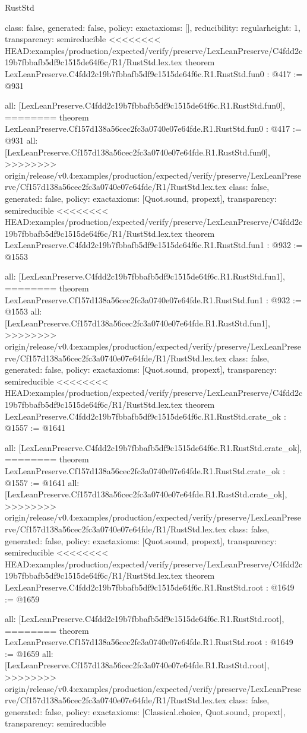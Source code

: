 \begin{lexlean}{RustStd}
\begin{coremodule}
{\begin{coremodule}
{{{  class: false,
  generated: false,
  policy: exact{axioms: []},
  reducibility: regular{height: 1},
  transparency: semireducible
}
<<<<<<<< HEAD:examples/production/expected/verify/preserve/LexLeanPreserve/C4fdd2c19b7fbbafb5df9c1515de64f6c/R1/RustStd.lex.tex
theorem LexLeanPreserve.C4fdd2c19b7fbbafb5df9c1515de64f6c.R1.RustStd.fun0 : @417 := @931 {
  all: [LexLeanPreserve.C4fdd2c19b7fbbafb5df9c1515de64f6c.R1.RustStd.fun0],
========
theorem LexLeanPreserve.Cf157d138a56cec2fc3a0740e07e64fde.R1.RustStd.fun0 : @417 := @931 {
  all: [LexLeanPreserve.Cf157d138a56cec2fc3a0740e07e64fde.R1.RustStd.fun0],
>>>>>>>> origin/release/v0.4:examples/production/expected/verify/preserve/LexLeanPreserve/Cf157d138a56cec2fc3a0740e07e64fde/R1/RustStd.lex.tex
  class: false,
  generated: false,
  policy: exact{axioms: [Quot.sound, propext]},
  transparency: semireducible
}
<<<<<<<< HEAD:examples/production/expected/verify/preserve/LexLeanPreserve/C4fdd2c19b7fbbafb5df9c1515de64f6c/R1/RustStd.lex.tex
theorem LexLeanPreserve.C4fdd2c19b7fbbafb5df9c1515de64f6c.R1.RustStd.fun1 : @932 := @1553 {
  all: [LexLeanPreserve.C4fdd2c19b7fbbafb5df9c1515de64f6c.R1.RustStd.fun1],
========
theorem LexLeanPreserve.Cf157d138a56cec2fc3a0740e07e64fde.R1.RustStd.fun1 : @932 := @1553 {
  all: [LexLeanPreserve.Cf157d138a56cec2fc3a0740e07e64fde.R1.RustStd.fun1],
>>>>>>>> origin/release/v0.4:examples/production/expected/verify/preserve/LexLeanPreserve/Cf157d138a56cec2fc3a0740e07e64fde/R1/RustStd.lex.tex
  class: false,
  generated: false,
  policy: exact{axioms: [Quot.sound, propext]},
  transparency: semireducible
}
<<<<<<<< HEAD:examples/production/expected/verify/preserve/LexLeanPreserve/C4fdd2c19b7fbbafb5df9c1515de64f6c/R1/RustStd.lex.tex
theorem LexLeanPreserve.C4fdd2c19b7fbbafb5df9c1515de64f6c.R1.RustStd.crate_ok : @1557 := @1641 {
  all: [LexLeanPreserve.C4fdd2c19b7fbbafb5df9c1515de64f6c.R1.RustStd.crate_ok],
========
theorem LexLeanPreserve.Cf157d138a56cec2fc3a0740e07e64fde.R1.RustStd.crate_ok : @1557 := @1641 {
  all: [LexLeanPreserve.Cf157d138a56cec2fc3a0740e07e64fde.R1.RustStd.crate_ok],
>>>>>>>> origin/release/v0.4:examples/production/expected/verify/preserve/LexLeanPreserve/Cf157d138a56cec2fc3a0740e07e64fde/R1/RustStd.lex.tex
  class: false,
  generated: false,
  policy: exact{axioms: [Quot.sound, propext]},
  transparency: semireducible
}
<<<<<<<< HEAD:examples/production/expected/verify/preserve/LexLeanPreserve/C4fdd2c19b7fbbafb5df9c1515de64f6c/R1/RustStd.lex.tex
theorem LexLeanPreserve.C4fdd2c19b7fbbafb5df9c1515de64f6c.R1.RustStd.root : @1649 := @1659 {
  all: [LexLeanPreserve.C4fdd2c19b7fbbafb5df9c1515de64f6c.R1.RustStd.root],
========
theorem LexLeanPreserve.Cf157d138a56cec2fc3a0740e07e64fde.R1.RustStd.root : @1649 := @1659 {
  all: [LexLeanPreserve.Cf157d138a56cec2fc3a0740e07e64fde.R1.RustStd.root],
>>>>>>>> origin/release/v0.4:examples/production/expected/verify/preserve/LexLeanPreserve/Cf157d138a56cec2fc3a0740e07e64fde/R1/RustStd.lex.tex
  class: false,
  generated: false,
  policy: exact{axioms: [Classical.choice, Quot.sound, propext]},
  transparency: semireducible
}

}}}}}}
\end{coremodule}}
\end{coremodule}
\end{lexlean}
